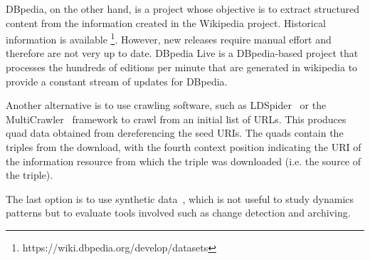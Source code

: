 \documentclass[sw]{iosart2x}
\begin{document}
DBpedia, on the other hand, is a project whose objective is to extract structured content from the information created in the Wikipedia project. Historical information is available \footnote{https://wiki.dbpedia.org/develop/datasets}. However, new releases require manual effort and therefore are not very up to date. DBpedia Live is a DBpedia-based project that processes the hundreds of editions per minute that are generated in wikipedia to provide a constant stream of updates for DBpedia. 

Another alternative is to use crawling software, such as LDSpider~\cite{IseleUBH10} or the MultiCrawler~\cite{HarthUD06} framework to crawl from an initial list of URLs. This produces quad data obtained from dereferencing the seed URIs. The quads contain the triples from the download, with the fourth context position indicating the URI of the information resource from which the triple was downloaded (i.e. the source of the triple).

The last option is to use synthetic data~\cite {MeimarisP16}, which is not useful to study dynamics patterns but to evaluate tools involved such as change detection and archiving.











\newpage
\nocite{*} 

%
\end{document}
